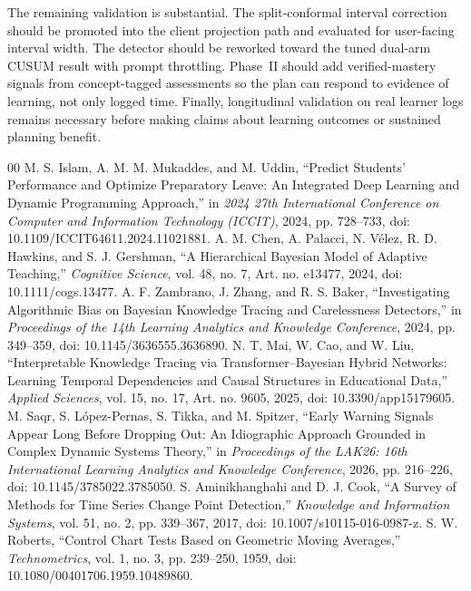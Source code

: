 \documentclass[conference]{IEEEtran}
\begin{document}
The remaining validation is substantial. The split-conformal interval correction should be promoted into the client projection path and evaluated for user-facing interval width. The detector should be reworked toward the tuned dual-arm CUSUM result with prompt throttling. Phase~II should add verified-mastery signals from concept-tagged assessments so the plan can respond to evidence of learning, not only logged time. Finally, longitudinal validation on real learner logs remains necessary before making claims about learning outcomes or sustained planning benefit.

\begin{thebibliography}{00}
 M. S. Islam, A. M. M. Mukaddes, and M. Uddin, ``Predict Students' Performance and Optimize Preparatory Leave: An Integrated Deep Learning and Dynamic Programming Approach,'' in \textit{2024 27th International Conference on Computer and Information Technology (ICCIT)}, 2024, pp. 728--733, doi: 10.1109/ICCIT64611.2024.11021881.
 A. M. Chen, A. Palacci, N. V\'elez, R. D. Hawkins, and S. J. Gershman, ``A Hierarchical Bayesian Model of Adaptive Teaching,'' \textit{Cognitive Science}, vol. 48, no. 7, Art. no. e13477, 2024, doi: 10.1111/cogs.13477.
 A. F. Zambrano, J. Zhang, and R. S. Baker, ``Investigating Algorithmic Bias on Bayesian Knowledge Tracing and Carelessness Detectors,'' in \textit{Proceedings of the 14th Learning Analytics and Knowledge Conference}, 2024, pp. 349--359, doi: 10.1145/3636555.3636890.
 N. T. Mai, W. Cao, and W. Liu, ``Interpretable Knowledge Tracing via Transformer--Bayesian Hybrid Networks: Learning Temporal Dependencies and Causal Structures in Educational Data,'' \textit{Applied Sciences}, vol. 15, no. 17, Art. no. 9605, 2025, doi: 10.3390/app15179605.
 M. Saqr, S. L\'opez-Pernas, S. Tikka, and M. Spitzer, ``Early Warning Signals Appear Long Before Dropping Out: An Idiographic Approach Grounded in Complex Dynamic Systems Theory,'' in \textit{Proceedings of the LAK26: 16th International Learning Analytics and Knowledge Conference}, 2026, pp. 216--226, doi: 10.1145/3785022.3785050.
 S. Aminikhanghahi and D. J. Cook, ``A Survey of Methods for Time Series Change Point Detection,'' \textit{Knowledge and Information Systems}, vol. 51, no. 2, pp. 339--367, 2017, doi: 10.1007/s10115-016-0987-z.
 S. W. Roberts, ``Control Chart Tests Based on Geometric Moving Averages,'' \textit{Technometrics}, vol. 1, no. 3, pp. 239--250, 1959, doi: 10.1080/00401706.1959.10489860.

\end{thebibliography}
\end{document}
